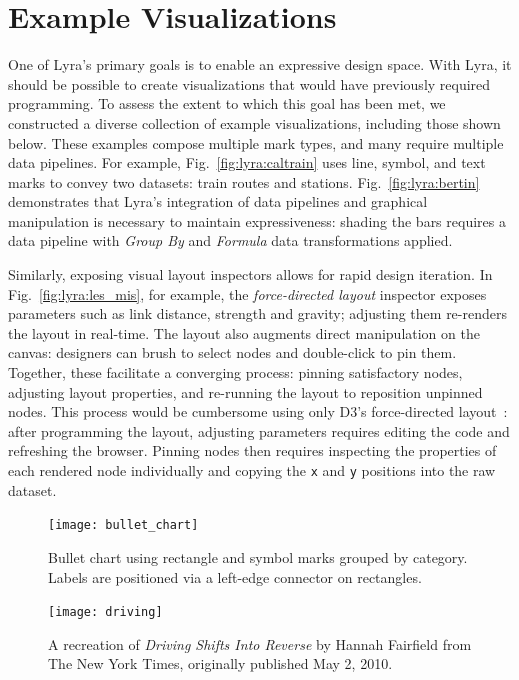 \section{Example Visualizations}

One of Lyra's primary goals is to enable an expressive design space. With Lyra,
it should be possible to create visualizations that would have previously
required programming. To assess the extent to which this goal has been met, we
constructed a diverse collection of example visualizations, including those
shown below. These examples compose multiple mark types, and many require
multiple data pipelines. For example, Fig.~\ref{fig:lyra:caltrain} uses line,
symbol, and text marks to convey two datasets: train routes and stations.
Fig.~\ref{fig:lyra:bertin} demonstrates that Lyra's integration of data
pipelines and graphical manipulation is necessary to maintain expressiveness:
shading the bars requires a data pipeline with \emph{Group By} and
\emph{Formula} data transformations applied.

Similarly, exposing visual layout inspectors allows for rapid design iteration.
In Fig.~\ref{fig:lyra:les_mis}, for example, the \emph{force-directed layout}
inspector exposes parameters such as link distance, strength and gravity;
adjusting them re-renders the layout in real-time. The layout also augments
direct manipulation on the canvas: designers can brush to select nodes and
double-click to pin them. Together, these facilitate a converging process:
pinning satisfactory nodes, adjusting layout properties, and re-running the
layout to reposition unpinned nodes. This process would be cumbersome using only
D3's force-directed layout~\cite{bostock:d3}: after programming the layout,
adjusting parameters requires editing the code and refreshing the browser.
Pinning nodes then requires inspecting the properties of each rendered node
individually and copying the \texttt{x} and \texttt{y} positions into the raw
dataset.

\begin{figure}[h!]
  \centering
  \texttt{[image: bullet\_chart]}
  \caption{Bullet chart using rectangle and symbol marks grouped
by category. Labels are positioned via a left-edge connector on rectangles.}
  \label{fig:lyra:bulletChart}
\end{figure}

\begin{figure}[h!]
  \centering
  \texttt{[image: driving]}
  \caption{A recreation of \emph{Driving Shifts Into Reverse} by Hannah
  Fairfield from The New York Times, originally published May 2, 2010.}
  \label{fig:lyra:gas_driving}
\end{figure}

